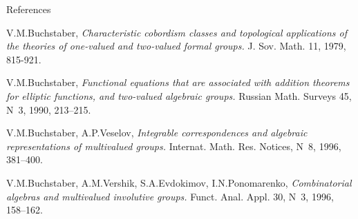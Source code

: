 \documentclass{beamer}
\newtheorem{thm}{Theorem}
\begin{document}





\begin{frame}{References}
\begin{thebibliography}{99}%
\small{
 V.M.Buchstaber,
\newblock\emph{Characteristic cobordism classes and topological applications of the theories of one-valued and
two-valued formal groups.}
\newblock  J. Sov. Math. 11, 1979, 815-921.

 V.M.Buchstaber,
\newblock \emph{Functional equations that are associated with addition theorems for  elliptic functions, and two-valued algebraic groups.}
\newblock Russian Math. Surveys 45, N~3, 1990,  213--215.

 V.M.Buchstaber, A.P.Veselov,
\newblock \emph{Integrable correspondences and algebraic representations of multivalued  groups.}
\newblock Internat. Math. Res. Notices, N~8, 1996, 381--400.

 V.M.Buchstaber, A.M.Vershik, S.A.Evdokimov, I.N.Ponomarenko,
\newblock \emph{Combinatorial algebras and multivalued involutive groups.}
\newblock Funct. Anal. Appl. 30, N~3, 1996, 158--162.
}
\end{thebibliography}

\end{frame}
\end{document}
